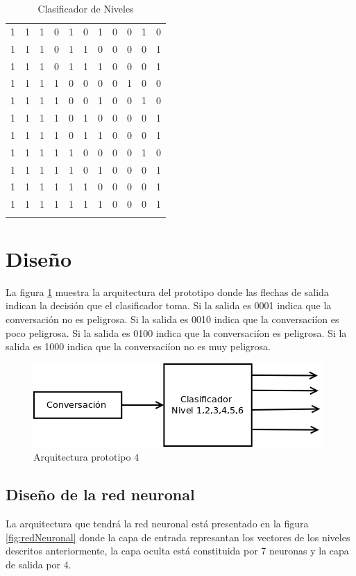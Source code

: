 \begin{longtable}{|c|c|c|c|c|c|c|c|c|c|c|}
1 & 1 & 1 & 0 & 1 & 0 & 1 &  0 & 0 & 1 & 0 \\
1 & 1 & 1 & 0 & 1 & 1 & 0 &  0 & 0 & 0 & 1 \\
1 & 1 & 1 & 0 & 1 & 1 & 1 &  0 & 0 & 0 & 1 \\
1 & 1 & 1 & 1 & 0 & 0 & 0 &  0 & 1 & 0 & 0 \\
1 & 1 & 1 & 1 & 0 & 0 & 1 &  0 & 0 & 1 & 0 \\
1 & 1 & 1 & 1 & 0 & 1 & 0 &  0 & 0 & 0 & 1 \\
1 & 1 & 1 & 1 & 0 & 1 & 1 &  0 & 0 & 0 & 1 \\
1 & 1 & 1 & 1 & 1 & 0 & 0 &  0 & 0 & 1 & 0 \\
1 & 1 & 1 & 1 & 1 & 0 & 1 &  0 & 0 & 0 & 1 \\
1 & 1 & 1 & 1 & 1 & 1 & 0 &  0 & 0 & 0 & 1 \\ 
1 & 1 & 1 & 1 & 1 & 1 & 1 &  0 & 0 & 0 & 1 \\
\hline

\caption{Clasificador de Niveles}
\label{tab:TablaNiveles}
\end{longtable}

\section{Dise\~no}
La figura \ref{fig:arquitecturaNivel4} muestra la arquitectura del prototipo donde las flechas de salida indican la decisi\'on que el clasificador toma. Si la salida es 0001 indica que la conversaci\'on no es peligrosa. Si la salida es 0010 indica que la conversaci\'ion es poco peligrosa. Si la salida es 0100 indica que la conversaci\'ion es peligrosa. Si la salida es 1000 indica que la conversaci\'ion no es muy peligrosa.

\begin{figure}
\begin{center}
\includegraphics[scale=.5]{images/arquitecturaprotipo4}
\caption{Arquitectura prototipo 4}
\label{fig:arquitecturaNivel4}
\end{center}
\end{figure} 

\subsection{Dise\~no de la red neuronal}
La arquitectura que tendr\'a la red neuronal est\'a presentado en la figura \ref{fig:redNeuronal} donde la capa de entrada represantan los vectores de los niveles descritos anteriormente, la capa oculta est\'a constituida por 7 neuronas y la capa de salida por 4.

